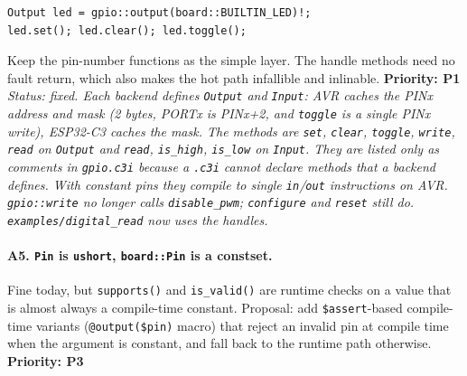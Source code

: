\documentclass[11pt,a4paper]{article}
\newcommand{\pkg}[1]{\texttt{#1}}
\newcommand{\prio}[1]{\textbf{Priority: #1}}
\begin{document}
\begin{lstlisting}[language=C3]
Output led = gpio::output(board::BUILTIN_LED)!;
led.set(); led.clear(); led.toggle();
\end{lstlisting}
Keep the pin-number functions as the simple layer. The handle methods need no fault return,
which also makes the hot path infallible and inlinable. \prio{P1}
\textit{Status: fixed. Each backend defines \pkg{Output} and \pkg{Input}: AVR caches the PINx address and mask (2 bytes, PORTx is PINx+2, and \pkg{toggle} is a single PINx write), ESP32-C3 caches the mask. The methods are \pkg{set}, \pkg{clear}, \pkg{toggle}, \pkg{write}, \pkg{read} on \pkg{Output} and \pkg{read}, \pkg{is\_high}, \pkg{is\_low} on \pkg{Input}. They are listed only as comments in \pkg{gpio.c3i} because a \pkg{.c3i} cannot declare methods that a backend defines. With constant pins they compile to single \pkg{in}/\pkg{out} instructions on AVR. \pkg{gpio::write} no longer calls \pkg{disable\_pwm}; \pkg{configure} and \pkg{reset} still do. \pkg{examples/digital\_read} now uses the handles.}

\paragraph{A5. \pkg{Pin} is \pkg{ushort}, \pkg{board::Pin} is a constset.}
Fine today, but \pkg{supports()} and \pkg{is\_valid()} are runtime checks on a value that is almost
always a compile-time constant. Proposal: add \pkg{\$assert}-based compile-time variants
(\pkg{@output(\$pin)} macro) that reject an invalid pin at compile time when the argument is
constant, and fall back to the runtime path otherwise. \prio{P3}
\end{document}
